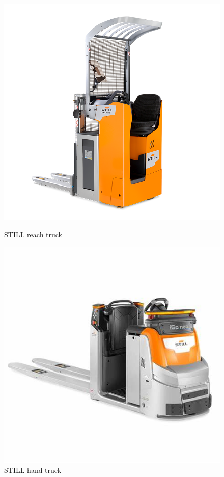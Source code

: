 \begin{figure}[H]
    \centering
    \begin{minipage}{0.45\textwidth}
        \centering
        \includegraphics[width=\linewidth]{images/Chap0/double-.png} %
        \caption{STILL reach truck}
        \label{double-}
    \end{minipage}
    \begin{minipage}{0.45\textwidth}
        \centering
        \includegraphics[width=\linewidth]{images/Chap0/iGoNeo.jpg} %
        \caption{STILL hand truck}
        \label{iGoNeo}
    \end{minipage}
\end{figure}

